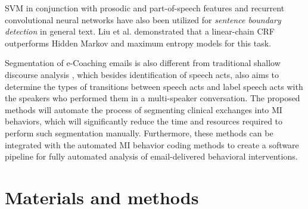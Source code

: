 \documentclass{amia}
\begin{document}
SVM in conjunction with prosodic and part-of-speech features \cite{kreuzthaler2015detection} and recurrent convolutional neural networks \cite{griffis2016quantitative} have also been utilized for \textit{sentence boundary detection} in general text. Liu et al. \cite{liu2005using} demonstrated that a linear-chain CRF outperforms Hidden Markov and maximum entropy models for this task. 

Segmentation of e-Coaching emails is also different from traditional shallow discourse analysis \cite{galley2003discourse}, which besides identification of speech acts, also aims to determine the types of transitions between speech acts and label speech acts with the speakers who performed them in a multi-speaker conversation. The proposed methods will automate the process of segmenting clinical exchanges into MI behaviors, which will significantly reduce the time and resources required to perform such segmentation manually. Furthermore, these methods can be integrated with the automated MI behavior coding methods \cite{hasan2016study,kotov2015interpretable} to create a software pipeline for fully automated analysis of email-delivered behavioral interventions.
  
\section*{Materials and methods}
\end{document}
